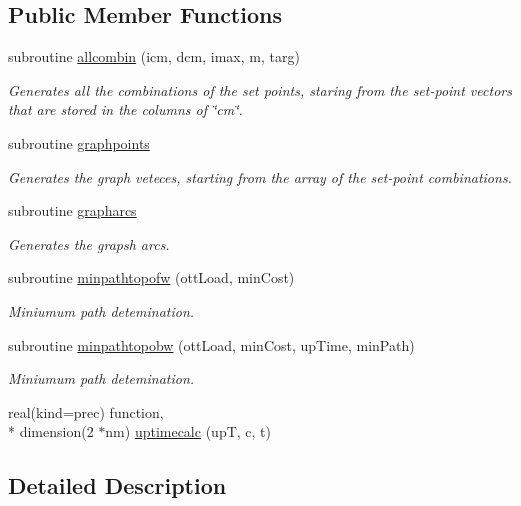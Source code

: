 \subsection*{Public Member Functions}
\begin{DoxyCompactItemize}
\item 
subroutine \hyperlink{classgraphtools_a4607d975b5dd57d2ca7fcdbab2b1ef56}{allcombin} (icm, dcm, imax, m, targ)
\begin{DoxyCompactList}\small\item\em Generates all the combinations of the set points, staring from the set-\/point vectors that are stored in the columns of \char`\"{}cm\char`\"{}. \end{DoxyCompactList}\item 
subroutine \hyperlink{classgraphtools_a94b8e6e5a3d3cc0c3bedbe00d57fc2f9}{graphpoints}
\begin{DoxyCompactList}\small\item\em Generates the graph veteces, starting from the array of the set-\/point combinations. \end{DoxyCompactList}\item 
subroutine \hyperlink{classgraphtools_a47c76f30f7f4917536f94c642ffca865}{grapharcs}
\begin{DoxyCompactList}\small\item\em Generates the grapsh arcs. \end{DoxyCompactList}\item 
subroutine \hyperlink{classgraphtools_ade3577b19aec190e8e056f041bc8afdf}{minpathtopofw} (ott\-Load, min\-Cost)
\begin{DoxyCompactList}\small\item\em Miniumum path detemination. \end{DoxyCompactList}\item 
subroutine \hyperlink{classgraphtools_abef4e47145f628bc6d3001d4f6bd9601}{minpathtopobw} (ott\-Load, min\-Cost, up\-Time, min\-Path)
\begin{DoxyCompactList}\small\item\em Miniumum path detemination. \end{DoxyCompactList}\item 
real(kind=prec) function, \\*
dimension(2 $\ast$nm) \hyperlink{classgraphtools_a0a5fc60233fedc07e2a6297bfa1763ba}{uptimecalc} (up\-T, c, t)
\end{DoxyCompactItemize}


\subsection{Detailed Description}


